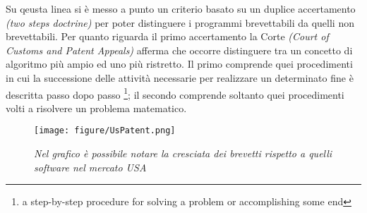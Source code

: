 Su qeusta linea si è messo a punto un criterio basato su un duplice accertamento \textit{(two steps doctrine)} per poter distinguere i programmi brevettabili da quelli non brevettabili. Per quanto riguarda il primo accertamento la Corte \textit{(Court of Customs and Patent Appeals)} afferma che occorre distinguere tra un concetto di algoritmo più ampio ed uno più ristretto. Il primo comprende quei procedimenti in cui la successione delle attività necessarie per realizzare un determinato fine è descritta passo dopo passo \footnote{a step-by-step procedure for solving a problem or accomplishing some end}; il secondo comprende soltanto quei procedimenti volti a risolvere un problema matematico.




\begin{figure}[bh]
	\begin{center}
		\texttt{[image: figure/UsPatent.png]}
	\end{center}
	\caption{\textit{Nel grafico è possibile notare la cresciata dei brevetti rispetto a quelli software nel mercato USA}}
\end{figure}

